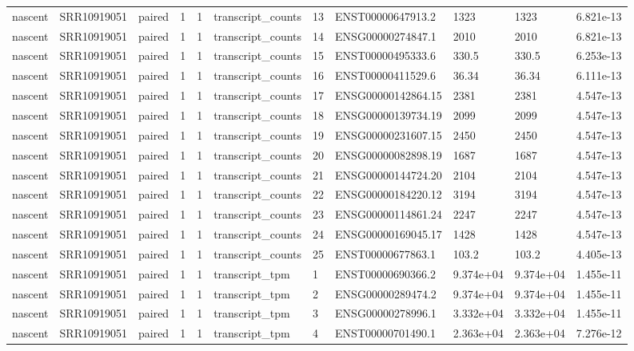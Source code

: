 \begin{tabular}{lllllllllll}
nascent & SRR10919051 & paired & 1 & 1 & transcript\_counts & 13 & ENST00000647913.2 & 1323 & 1323 & 6.821e-13 \\
nascent & SRR10919051 & paired & 1 & 1 & transcript\_counts & 14 & ENSG00000274847.1 & 2010 & 2010 & 6.821e-13 \\
nascent & SRR10919051 & paired & 1 & 1 & transcript\_counts & 15 & ENST00000495333.6 & 330.5 & 330.5 & 6.253e-13 \\
nascent & SRR10919051 & paired & 1 & 1 & transcript\_counts & 16 & ENST00000411529.6 & 36.34 & 36.34 & 6.111e-13 \\
nascent & SRR10919051 & paired & 1 & 1 & transcript\_counts & 17 & ENSG00000142864.15 & 2381 & 2381 & 4.547e-13 \\
nascent & SRR10919051 & paired & 1 & 1 & transcript\_counts & 18 & ENSG00000139734.19 & 2099 & 2099 & 4.547e-13 \\
nascent & SRR10919051 & paired & 1 & 1 & transcript\_counts & 19 & ENSG00000231607.15 & 2450 & 2450 & 4.547e-13 \\
nascent & SRR10919051 & paired & 1 & 1 & transcript\_counts & 20 & ENSG00000082898.19 & 1687 & 1687 & 4.547e-13 \\
nascent & SRR10919051 & paired & 1 & 1 & transcript\_counts & 21 & ENSG00000144724.20 & 2104 & 2104 & 4.547e-13 \\
nascent & SRR10919051 & paired & 1 & 1 & transcript\_counts & 22 & ENSG00000184220.12 & 3194 & 3194 & 4.547e-13 \\
nascent & SRR10919051 & paired & 1 & 1 & transcript\_counts & 23 & ENSG00000114861.24 & 2247 & 2247 & 4.547e-13 \\
nascent & SRR10919051 & paired & 1 & 1 & transcript\_counts & 24 & ENSG00000169045.17 & 1428 & 1428 & 4.547e-13 \\
nascent & SRR10919051 & paired & 1 & 1 & transcript\_counts & 25 & ENST00000677863.1 & 103.2 & 103.2 & 4.405e-13 \\
nascent & SRR10919051 & paired & 1 & 1 & transcript\_tpm & 1 & ENST00000690366.2 & 9.374e+04 & 9.374e+04 & 1.455e-11 \\
nascent & SRR10919051 & paired & 1 & 1 & transcript\_tpm & 2 & ENSG00000289474.2 & 9.374e+04 & 9.374e+04 & 1.455e-11 \\
nascent & SRR10919051 & paired & 1 & 1 & transcript\_tpm & 3 & ENSG00000278996.1 & 3.332e+04 & 3.332e+04 & 1.455e-11 \\
nascent & SRR10919051 & paired & 1 & 1 & transcript\_tpm & 4 & ENST00000701490.1 & 2.363e+04 & 2.363e+04 & 7.276e-12 \\

\end{tabular}
